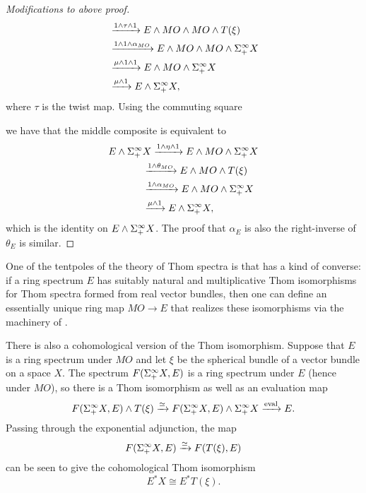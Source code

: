 \begin{proof}[Modifications to above proof]
\begin{align*}
& \xrightarrow{1 \wedge \tau \wedge 1} E \wedge MO \wedge MO \wedge T(\xi) \\
& \xrightarrow{1 \wedge 1 \wedge \alpha_{MO}} E \wedge MO \wedge MO \wedge \Sigma^\infty_+ X \\
& \xrightarrow{\mu \wedge 1 \wedge 1} E \wedge MO \wedge \Sigma^\infty_+ X \\
& \xrightarrow{\mu \wedge 1} E \wedge \Sigma^\infty_+ X,
\end{align*}
where \(\tau\) is the twist map.  Using the commuting square
\begin{center}
\end{center}
we have that the middle composite is equivalent to
\begin{align*}
E \wedge \Sigma^\infty_+ & X \xrightarrow{1 \wedge \eta \wedge 1} E \wedge MO \wedge \Sigma^\infty_+ X \\
& \xrightarrow{1 \wedge \theta_{MO}} E \wedge MO \wedge T(\xi) \\
& \xrightarrow{1 \wedge \alpha_{MO}} E \wedge MO \wedge \Sigma^\infty_+ X \\
& \xrightarrow{\mu \wedge 1} E \wedge \Sigma^\infty_+ X,
\end{align*}
which is the identity on \(E \wedge \Sigma^\infty_+ X\).  The proof that \(\alpha_E\) is also the right-inverse of \(\theta_E\) is similar.
\end{proof}

\begin{remark}
One of the tentpoles of the theory of Thom spectra is that  has a kind of converse: if a ring spectrum \(E\) has suitably natural and multiplicative Thom isomorphisms for Thom spectra formed from real vector bundles, then one can define an essentially unique ring map \(MO \to E\) that realizes these isomorphisms via the machinery of .
\end{remark}

\begin{remark}\label{CohomologicalThomIso}
There is also a cohomological version of the Thom isomorphism.  Suppose that \(E\) is a ring spectrum under \(MO\) and let \(\xi\) be the spherical bundle of a vector bundle on a space \(X\).  The spectrum \(F(\Sigma^\infty_+ X, E)\) is a ring spectrum under \(E\) (hence under \(MO\)), so there is a Thom isomorphism as well as an evaluation map \[F(\Sigma^\infty_+ X, E) \wedge T(\xi) \xrightarrow{\simeq} F(\Sigma^\infty_+ X, E) \wedge \Sigma^\infty_+ X \xrightarrow{\operatorname{eval}} E.\]  Passing through the exponential adjunction, the map \[F(\Sigma^\infty_+ X, E) \xrightarrow{\simeq} F(T(\xi), E)\] can be seen to give the cohomological Thom isomorphism \[E^* X \cong E^* T(\xi).\]
\end{remark}

